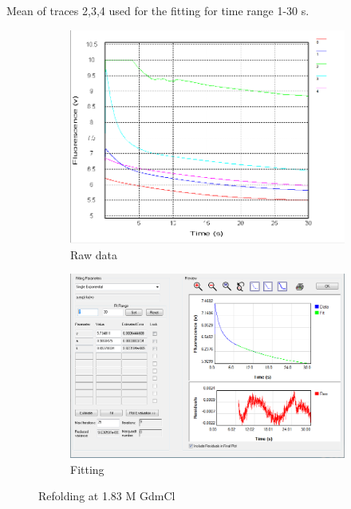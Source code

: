 \documentclass[a4paper,english,12pt,bibliography=totoc]{scrreprt}
\begin{document}
Mean of traces 2,3,4 used for the fitting for time range 1-30 s.
\begin{figure}[H]
    \centering
    \begin{subfigure}[b]{0.45\textwidth}
        \centering
        \includegraphics[width=\textwidth]{Images/G8/rf3-raw.PNG}
        \caption{Raw data }
        \label{fig:sub1}
    \end{subfigure}
    \hspace{0cm} %
    \begin{subfigure}[b]{0.45\textwidth}
        \centering
        \includegraphics[width=\textwidth]{Images/G8/rf3_fitting.PNG}
        \caption{Fitting}
        \label{fig:sub2}
    \end{subfigure}
    \caption{Refolding at  1.83 M GdmCl }
    \label{fig:main}
\end{figure}
\end{document}
